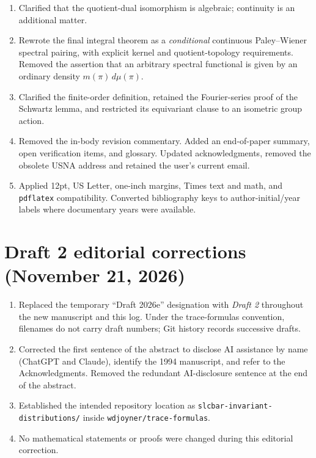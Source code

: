 \documentclass[12pt,letterpaper]{article}
\begin{document}
\begin{enumerate}[leftmargin=*,itemsep=4pt]
the special constituent and the kernel non-tempered, whereas the supplied
2026d correction reverses them.  Demoted the endpoint proposition to a
verification remark and inserted a separate section surveying the original
conjectures without claiming they were all resolved.
\item Clarified that the quotient-dual isomorphism is algebraic;
continuity is an additional matter.
\item Rewrote the final integral theorem as a \emph{conditional}
continuous Paley--Wiener spectral pairing, with explicit kernel and
quotient-topology requirements.  Removed the assertion that an arbitrary
spectral functional is given by an ordinary density $m(\pi)\,d\mu(\pi)$.
\item Clarified the finite-order definition, retained the Fourier-series
proof of the Schwartz lemma, and restricted its equivariant clause to an
isometric group action.
\item Removed the in-body revision commentary. Added an end-of-paper
summary, open verification items, and glossary.  Updated acknowledgments,
removed the obsolete USNA address and retained the user's current email.
\item Applied 12pt, US Letter, one-inch margins, Times text and math,
and \texttt{pdflatex} compatibility.  Converted bibliography keys to
author-initial/year labels where documentary years were available.
\end{enumerate}

\section*{Draft 2 editorial corrections (November 21, 2026)}
\begin{enumerate}[leftmargin=*,itemsep=4pt]
\item Replaced the temporary ``Draft 2026e'' designation with \emph{Draft 2} throughout the new manuscript and this log. Under the trace-formulas convention, filenames do not carry draft numbers; Git history records successive drafts.
\item Corrected the first sentence of the abstract to disclose AI assistance by name (ChatGPT and Claude), identify the 1994 manuscript, and refer to the Acknowledgments. Removed the redundant AI-disclosure sentence at the end of the abstract.
\item Established the intended repository location as \texttt{slcbar-invariant-distributions/} inside \texttt{wdjoyner/trace-formulas}.
\item No mathematical statements or proofs were changed during this editorial correction.
\end{enumerate}
\end{document}
